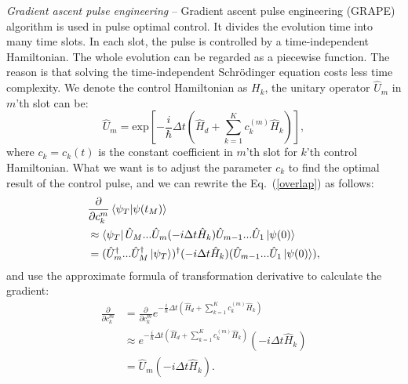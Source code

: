 \textit{Gradient ascent pulse engineering} -- Gradient ascent pulse engineering (GRAPE) algorithm is used in pulse optimal control. It divides the evolution time into many time slots. In each slot, the pulse is controlled by a time-independent Hamiltonian. The whole evolution can be regarded as a piecewise function. The reason is that solving the time-independent Schr\"{o}dinger equation costs less time complexity. We denote the control Hamiltonian as $H_{k}$, the unitary operator $\hat{U}_{m}$ in $m$'th slot can be:
\begin{equation}
    \hat{U}_{m}=\mathrm{exp}\left[-\frac{i}{\hbar}\Delta t\left(\hat{H}_{d}+\sum_{k=1}^{K}c_{k}^{(m)}\hat{H}_{k}\right)\right],
\end{equation}
where $c_{k}=c_{k}(t)$ is the constant coefficient in $m$'th slot for $k$'th control Hamiltonian. What we want is to adjust the parameter $c_{k}$ to find the optimal result of the control pulse, and we can rewrite the Eq.~(\ref{overlap}) as follows:
\begin{equation}
    \begin{aligned}
         & \frac{\partial}{\partial c_{k}^{m}}\braket{\psi_{T}|\psi(t_M)}                                                                             \\
         & \approx\bra{\psi_{T}}\hat{U}_{M}...\hat{U}_{m}(-i\Delta t\hat{H}_{k})\hat{U}_{m-1}...\hat{U}_{1}\ket{\psi(0)}                              \\
         & =(\hat{U}_{m}^{\dagger}...\hat{U}_{M}^{\dagger}\ket{\psi_{T}})^{\dagger}(-i\Delta t\hat{H}_{k})(\hat{U}_{m-1}...\hat{U}_{1}\ket{\psi(0)}),
    \end{aligned}
\end{equation}
and use the approximate formula of transformation derivative to calculate the gradient:
\begin{equation}
    \begin{aligned}
        \frac{\partial}{\partial c_{k}^{m}} & =\frac{\partial}{\partial c_{k}^{m}}e^{-\frac{i}{\hbar}\Delta t\left(\hat{H}_{d}+\sum_{k=1}^{K}c_{k}^{(m)}\hat{H}_{k}\right)} \\
                                            & \approx e^{-\frac{i}{\hbar}\Delta t\left(\hat{H}_{d}+\sum_{k=1}^{K}c_{k}^{(m)}\hat{H}_{k}\right)}(-i\Delta t\hat{H}_{k})      \\
                                            & =\hat{U}_{m}(-i\Delta t\hat{H}_{k}).
    \end{aligned}
\end{equation}
